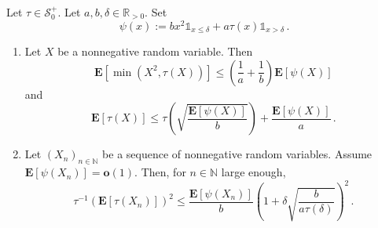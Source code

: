 \documentclass{article}
\newcommand*{\mc}[1]{\mathcal{#1}}
\newcommand*{\mo}[1]{\mathbf{#1}}
\newcommand{\N}{\mathbb{N}}
\newcommand{\R}{\mathbb{R}}
\newcommand{\Rpp}{\R_{>0}}
\newcommand{\lab}{\left[} %
\newcommand{\rab}{\right]} %
\newcommand{\ab}[1]{\lab #1 \rab} %
\newcommand{\abOf}[1]{\!\ab{#1}} %
\newcommand{\lb}{\left(} %
\newcommand{\rb}{\right)} %
\newcommand{\br}[1]{\lb #1 \rb} %
\newcommand{\brOf}[1]{\!\br{#1}} %
\newcommand{\E}{\mathbf{E}} %
\newcommand{\Eof}[1]{\E[#1]}
\newcommand{\EOf}[1]{\E\abOf{#1}}
\newcommand{\ind}{\mathds{1}}%
\newcommand{\indOf}[1]{\ind_{\!#1}}%
\newcommand{\eqfs}{\,.}
\newcommand{\tran}{\tau}
\newcommand{\setcciz}{\mc S_0^+}
\begin{document}
\begin{lemma}\label{lmm:loss:totran}
    Let $\tran\in\setcciz$.
    Let $a,b,\delta\in\Rpp$.
    Set
    \begin{equation}
        \psi(x) := b x^2\indOf{x\leq\delta}
        +
        a\tran(x)\indOf{x>\delta}
        \eqfs
    \end{equation}
    \begin{enumerate}[label=(\roman*)]
        \item
        Let $X$ be a nonnegative random variable.
        Then
        \begin{equation}
            \EOf{\min\brOf{X^2,\tran(X)}}
            \leq
            \br{\frac{1}{a} + \frac{1}{b}} \EOf{\psi(X)}
        \end{equation}
        and
        \begin{equation}
            \EOf{\tran(X)}
            \leq
            \tran\brOf{\sqrt{\frac{\EOf{\psi(X)}}{b}}}
            +
            \frac{\EOf{\psi(X)}}{a}
            \eqfs
        \end{equation}
        \item
        Let $(X_n)_{n\in\N}$ be a sequence of nonnegative random variables.
        Assume $\Eof{\psi(X_n)} = \mo o(1)$.
        Then, for $n\in\N$ large enough,
        \begin{equation}
            \tran^{-1}\brOf{\EOf{\tran(X_n)}}^2
            \leq
            \frac{\Eof{\psi(X_n)}}{b}\br{1 + \delta \sqrt{\frac{b}{a\tran(\delta)}}}^2
            \eqfs
        \end{equation}   
    \end{enumerate}
\end{lemma}
\end{document}

